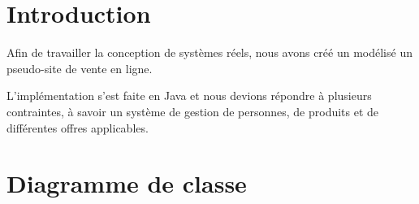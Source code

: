 \documentclass{article}
\begin{document}



\section*{Introduction}

Afin de travailler la conception de systèmes réels, nous avons créé un modélisé un pseudo-site de vente en ligne.\par
L'implémentation s'est faite en Java et nous devions répondre à plusieurs contraintes, à savoir un système de gestion de personnes, de produits et de différentes offres applicables.

\clearpage

\section*{Diagramme de classe}
\end{document}
